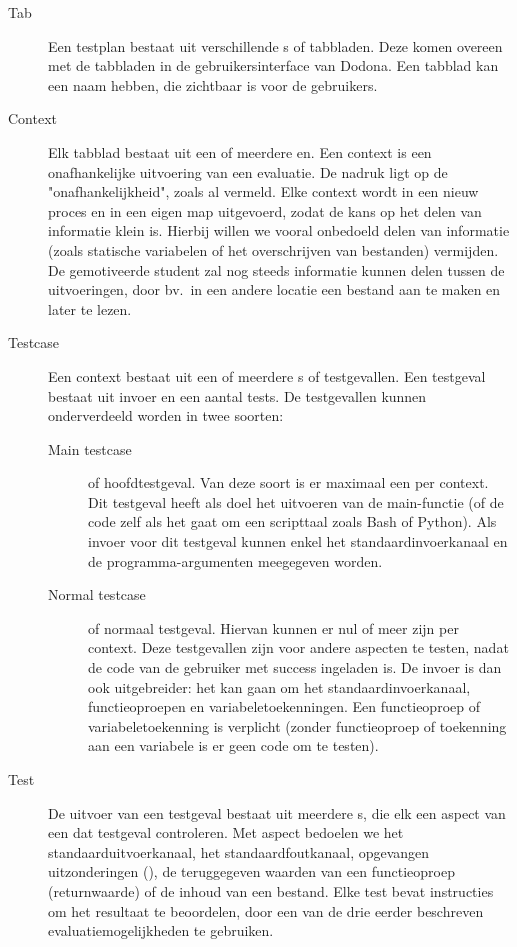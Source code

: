 \begin{description}
    \item[Tab] Een testplan bestaat uit verschillende s of tabbladen.
    Deze komen overeen met de tabbladen in de gebruikersinterface van Dodona.
    Een tabblad kan een naam hebben, die zichtbaar is voor de gebruikers.
    \item[Context] Elk tabblad bestaat uit een of meerdere en.
    Een context is een onafhankelijke uitvoering van een evaluatie.
    De nadruk ligt op de "onafhankelijkheid", zoals al vermeld.
    Elke context wordt in een nieuw proces en in een eigen map uitgevoerd, zodat de kans op het delen van informatie klein is.
    Hierbij willen we vooral onbedoeld delen van informatie (zoals statische variabelen of het overschrijven van bestanden) vermijden.
    De gemotiveerde student zal nog steeds informatie kunnen delen tussen de uitvoeringen, door bv.\ in een andere locatie een bestand aan te maken en later te lezen.
    \item[Testcase] Een context bestaat uit een of meerdere s of testgevallen.
    Een testgeval bestaat uit invoer en een aantal tests.
    De testgevallen kunnen onderverdeeld worden in twee soorten:
    \begin{description}
        \item[Main testcase] of hoofdtestgeval.
        Van deze soort is er maximaal een per context.
        Dit testgeval heeft als doel het uitvoeren van de main-functie (of de code zelf als het gaat om een scripttaal zoals Bash of Python).
        Als invoer voor dit testgeval kunnen enkel het standaardinvoerkanaal en de programma-argumenten meegegeven worden.
        \item[Normal testcase] of normaal testgeval.
        Hiervan kunnen er nul of meer zijn per context.
        Deze testgevallen zijn voor andere aspecten te testen, nadat de code van de gebruiker met success ingeladen is.
        De invoer is dan ook uitgebreider: het kan gaan om het standaardinvoerkanaal, functieoproepen en variabeletoekenningen.
        Een functieoproep of variabeletoekenning is verplicht (zonder functieoproep of toekenning aan een variabele is er geen code om te testen).
    \end{description}
    \item[Test] De uitvoer van een testgeval bestaat uit meerdere s, die elk een aspect van een dat testgeval controleren.
    Met aspect bedoelen we het standaarduitvoerkanaal, het standaardfoutkanaal, opgevangen uitzonderingen (), de teruggegeven waarden van een functieoproep (returnwaarde) of de inhoud van een bestand.
    Elke test bevat instructies om het resultaat te beoordelen, door een van de drie eerder beschreven evaluatiemogelijkheden te gebruiken.
\end{description}

